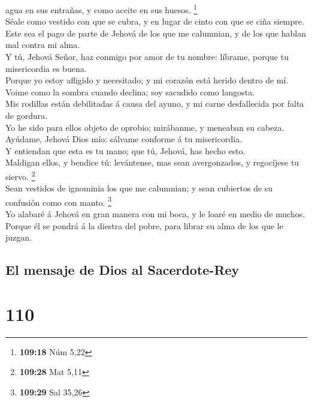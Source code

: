 agua en sus entrañas, y como aceite en sus huesos. \footnote{\textbf{109:18}
  Núm 5,22}\\
 Séale como vestido con que se cubra, y en lugar de cinto
con que se ciña siempre.\\
 Este sea el pago de parte de Jehová de los que me
calumnian, y de los que hablan mal contra mi alma.\\
 Y tú, Jehová Señor, haz conmigo por amor de tu nombre:
líbrame, porque tu misericordia es buena.\\
 Porque yo estoy afligido y necesitado; y mi corazón está
herido dentro de mí.\\
 Voime como la sombra cuando declina; soy sacudido como
langosta.\\
 Mis rodillas están debilitadas á causa del ayuno, y mi
carne desfallecida por falta de gordura.\\
 Yo he sido para ellos objeto de oprobio; mirábanme, y
meneaban su cabeza.\\
 Ayúdame, Jehová Dios mío: sálvame conforme á tu
misericordia.\\
 Y entiendan que esta es tu mano; que tú, Jehová, has hecho
esto.\\
 Maldigan ellos, y bendice tú: levántense, mas sean
avergonzados, y regocíjese tu siervo. \footnote{\textbf{109:28} Mat 5,11}\\
 Sean vestidos de ignominia los que me calumnian; y sean
cubiertos de su confusión como con manto. \footnote{\textbf{109:29} Sal
  35,26}\\
 Yo alabaré á Jehová en gran manera con mi boca, y le loaré
en medio de muchos.\\
 Porque él se pondrá á la diestra del pobre, para librar su
alma de los que le juzgan.

\hypertarget{el-mensaje-de-dios-al-sacerdote-rey}{%
\subsection{El mensaje de Dios al
Sacerdote-Rey}\label{el-mensaje-de-dios-al-sacerdote-rey}}

\hypertarget{section-109}{%
\section{110}\label{section-109}}

